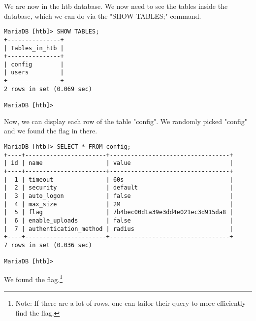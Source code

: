 \documentclass[conference]{IEEEtran}
\begin{document}
We are now in the htb database. We now need to see the tables inside the database, which we can do via the "SHOW TABLES;" command.

\begin{scriptsize}
\begin{verbatim}
MariaDB [htb]> SHOW TABLES;
+---------------+
| Tables_in_htb |
+---------------+
| config        |
| users         |
+---------------+
2 rows in set (0.069 sec)

MariaDB [htb]>
\end{verbatim}
\end{scriptsize}


Now, we can display each row of the table "config". We randomly picked "config" and we found the flag in there.

\begin{scriptsize}
\begin{verbatim}
MariaDB [htb]> SELECT * FROM config;
+----+-----------------------+----------------------------------+
| id | name                  | value                            |
+----+-----------------------+----------------------------------+
|  1 | timeout               | 60s                              |
|  2 | security              | default                          |
|  3 | auto_logon            | false                            |
|  4 | max_size              | 2M                               |
|  5 | flag                  | 7b4bec00d1a39e3dd4e021ec3d915da8 |
|  6 | enable_uploads        | false                            |
|  7 | authentication_method | radius                           |
+----+-----------------------+----------------------------------+
7 rows in set (0.036 sec)

MariaDB [htb]>
\end{verbatim}
\end{scriptsize}

We found the flag.\footnote{Note: If there are a lot of rows, one can tailor their query to more efficiently find the flag.}
\end{document}
